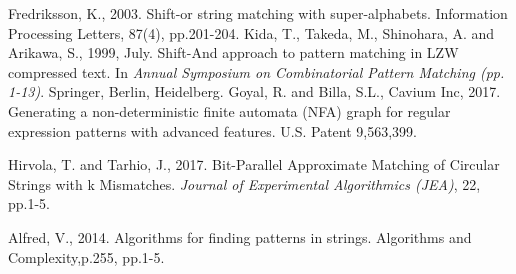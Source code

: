 \begin{thebibliography}{99.}
Fredriksson, K., 2003. Shift-or string matching with super-alphabets. Information Processing Letters, 87(4), pp.201-204.
Kida, T., Takeda, M., Shinohara, A. and Arikawa, S., 1999, July. Shift-And approach to pattern matching in LZW compressed text. In \textit{Annual Symposium on Combinatorial Pattern Matching (pp. 1-13)}. Springer, Berlin, Heidelberg.
Goyal, R. and Billa, S.L., Cavium Inc, 2017. Generating a non-deterministic finite automata (NFA) graph for regular expression patterns with advanced features. U.S. Patent
9,563,399.

Hirvola, T. and Tarhio, J., 2017. Bit-Parallel Approximate Matching of Circular Strings with k Mismatches. \textit{Journal of Experimental Algorithmics (JEA)}, 22, pp.1-5.

Alfred, V., 2014. Algorithms for finding patterns in strings. Algorithms and Complexity,p.255, pp.1-5.

\end{thebibliography}
